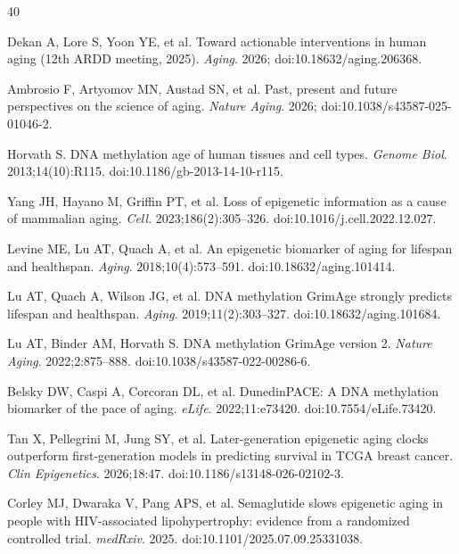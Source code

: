 \documentclass[11pt,a4paper]{article}
\begin{document}
\newpage

\begin{thebibliography}{40}

Dekan A, Lore S, Yoon YE, et al.
Toward actionable interventions in human aging (12th ARDD meeting, 2025).
\textit{Aging}. 2026; doi:10.18632/aging.206368.

Ambrosio F, Artyomov MN, Austad SN, et al.
Past, present and future perspectives on the science of aging.
\textit{Nature Aging}. 2026; doi:10.1038/s43587-025-01046-2.

Horvath S.
DNA methylation age of human tissues and cell types.
\textit{Genome Biol}. 2013;14(10):R115.
doi:10.1186/gb-2013-14-10-r115.

Yang JH, Hayano M, Griffin PT, et al.
Loss of epigenetic information as a cause of mammalian aging.
\textit{Cell}. 2023;186(2):305--326.
doi:10.1016/j.cell.2022.12.027.

Levine ME, Lu AT, Quach A, et al.
An epigenetic biomarker of aging for lifespan and healthspan.
\textit{Aging}. 2018;10(4):573--591.
doi:10.18632/aging.101414.

Lu AT, Quach A, Wilson JG, et al.
DNA methylation GrimAge strongly predicts lifespan and healthspan.
\textit{Aging}. 2019;11(2):303--327.
doi:10.18632/aging.101684.

Lu AT, Binder AM, Horvath S.
DNA methylation GrimAge version 2.
\textit{Nature Aging}. 2022;2:875--888.
doi:10.1038/s43587-022-00286-6.

Belsky DW, Caspi A, Corcoran DL, et al.
DunedinPACE: A DNA methylation biomarker of the pace of aging.
\textit{eLife}. 2022;11:e73420.
doi:10.7554/eLife.73420.

Tan X, Pellegrini M, Jung SY, et al.
Later-generation epigenetic aging clocks outperform first-generation models in predicting survival in TCGA breast cancer.
\textit{Clin Epigenetics}. 2026;18:47.
doi:10.1186/s13148-026-02102-3.

Corley MJ, Dwaraka V, Pang APS, et al.
Semaglutide slows epigenetic aging in people with HIV-associated lipohypertrophy: evidence from a randomized controlled trial.
\textit{medRxiv}. 2025.
doi:10.1101/2025.07.09.25331038.


\end{thebibliography}
\end{document}
